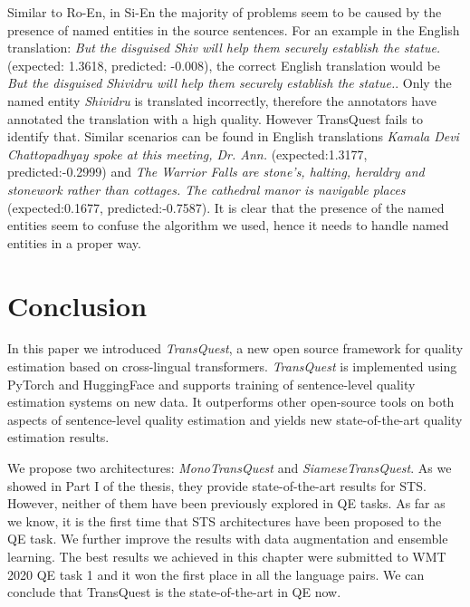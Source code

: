 Similar to Ro-En, in Si-En the majority of problems seem to be caused by the presence of named entities in the source sentences. For an example in the English translation: \emph{But the disguised Shiv will help them securely establish the statue.
} (expected: 1.3618, predicted: -0.008), the correct English translation would be \emph{But the disguised Shividru will help them securely establish the statue.}. Only the named entity \emph{Shividru} is translated incorrectly, therefore the annotators have annotated the translation with a high quality. However TransQuest fails to identify that. Similar scenarios can be found in English translations \emph{Kamala Devi Chattopadhyay spoke at this meeting, Dr. Ann.} (expected:1.3177, predicted:-0.2999) and \emph{The Warrior Falls are stone's, halting, heraldry and stonework rather than cottages. The cathedral manor is navigable places} (expected:0.1677, predicted:-0.7587). It is clear that the presence of the named entities seem to confuse the algorithm we used, hence it needs to handle named entities in a proper way.


\section{Conclusion}
\label{sec:transquest_conclusion}
In this paper we introduced \textit{TransQuest}, a new open source framework for quality estimation based on cross-lingual transformers. \textit{TransQuest} is implemented using PyTorch \cite{NEURIPS2019_9015} and HuggingFace \cite{wolf-etal-2020-transformers} and supports training of sentence-level quality estimation systems on new data. It outperforms other open-source tools on both aspects of sentence-level quality estimation and yields new state-of-the-art quality estimation results. 


We propose two architectures: \textit{MonoTransQuest} and \textit{SiameseTransQuest}. As we showed in Part I of the thesis, they provide state-of-the-art results for STS. However, neither of them have been previously explored in QE tasks. As far as we know, it is the first time that STS architectures have been proposed to the QE task. We further improve the results with data augmentation and ensemble learning. The best results we achieved in this chapter were submitted to WMT 2020 QE task 1 and it won the first place in all the language pairs. We can conclude that TransQuest is the state-of-the-art in QE now.

